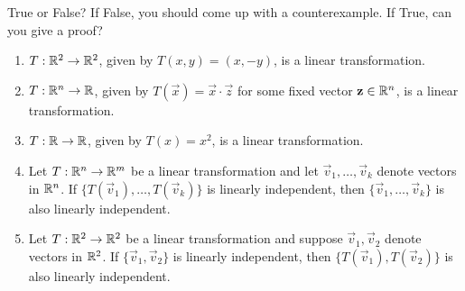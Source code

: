 \documentclass{ximera}
\begin{document}
 \begin{exercise}
 
True or False?  If False, you should come up with a counterexample.  If True, can you give a proof?
 
 \begin{enumerate}
 \item $T : \mathbb{R}^2 \to \mathbb{R}^2$, given by $T(x, y) = (x, -y)$, is a linear transformation.
 
 \begin{multipleChoice}
 \end{multipleChoice}
 
 \item $T : \mathbb{R}^n \to \mathbb{R}$, given by $T(\vec{x}) = \vec{x} \cdot \vec{z}$ for some fixed vector $\mathbf{z} \in \mathbb{R}^n$, is a linear transformation.
 
 \begin{multipleChoice}
 \end{multipleChoice}
 
\item $T : \mathbb{R} \to \mathbb{R}$, given by $T(x) = x^2$, is a linear transformation.
 
 \begin{multipleChoice}
 \end{multipleChoice}
 
 \item Let $T : \mathbb{R}^n \to \mathbb{R}^m$ be a linear transformation and let $\vec{v}_{1}, \dots, \vec{v}_{k}$ denote vectors in $\mathbb{R}^n$.  If $\{T(\vec{v}_{1}), \dots, T(\vec{v}_{k})\}$ is linearly independent, then $\{\vec{v}_{1}, \dots, \vec{v}_{k}\}$ is also linearly independent.
 
 \begin{multipleChoice}
 \end{multipleChoice}
 
 \item Let $T : \mathbb{R}^2 \to \mathbb{R}^2$ be a linear transformation and suppose $\vec{v}_{1}, \vec{v}_{2}$ denote vectors in $\mathbb{R}^2$.  If $\{\vec{v}_{1}, \vec{v}_{2}\}$ is linearly independent, then $\{T(\vec{v}_{1}), T(\vec{v}_{2})\}$ is also linearly independent.
 
 \begin{multipleChoice}
 \end{multipleChoice}
 \end{enumerate}
 
  
\end{exercise}
\end{document}
